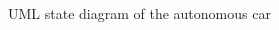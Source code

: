 \documentclass[12pt]{article}
\begin{document}
\begin{spacing}{1.5}
\begin{figure}[h!]
		  \caption{UML state diagram of the autonomous car}
  \label{fig:state-diagram}
\end{figure}

\end{spacing}
\end{document}
